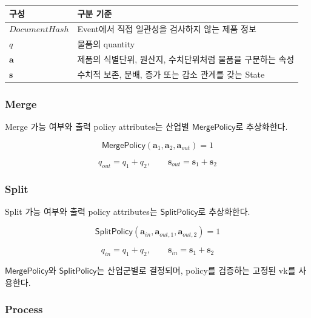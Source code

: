 \documentclass[11pt,a4paper]{extarticle}
\begin{document}
\begin{center}
  \renewcommand{\arraystretch}{1.35}
  \setlength{\tabcolsep}{8pt}
  \begin{tabularx}{\textwidth}{
      @{}
      >{\raggedright\arraybackslash}p{28mm}
      >{\raggedright\arraybackslash}X
      @{}
    }
    \toprule
    \textbf{구성} & \textbf{구분 기준}                    \\
    \midrule
    \(\mathit{DocumentHash}\)
                & Event에서 직접 일관성을 검사하지 않는 제품 정보     \\
    \(q\)
                & 물품의 quantity                      \\
    \(\mathbf{a}\)
                & 제품의 식별단위, 원산지, 수치단위처럼 물품을 구분하는 속성 \\
    \(\mathbf{s}\)
                & 수치적 보존, 분배, 증가 또는 감소 관계를 갖는 State \\
    \bottomrule
  \end{tabularx}
\end{center}

\subsubsection*{Merge}

Merge 가능 여부와 출력 policy attributes는 산업별
\(\mathsf{MergePolicy}\)로 추상화한다.

\[
  \mathsf{MergePolicy}
  (\mathbf{a}_1,\mathbf{a}_2,\mathbf{a}_{out})
  =1
\]

\[
  q_{out}=q_1+q_2,
  \qquad
  \mathbf{s}_{out}=\mathbf{s}_1+\mathbf{s}_2
\]

\subsubsection*{Split}

Split 가능 여부와 출력 policy attributes는
\(\mathsf{SplitPolicy}\)로 추상화한다.

\[
  \mathsf{SplitPolicy}
  (\mathbf{a}_{in},\mathbf{a}_{out,1},\mathbf{a}_{out,2})
  =1
\]

\[
  q_{in}=q_1+q_2,
  \qquad
  \mathbf{s}_{in}=\mathbf{s}_1+\mathbf{s}_2
\]

\(\mathsf{MergePolicy}\)와 \(\mathsf{SplitPolicy}\)는 산업군별로 결정되며,
policy를 검증하는 고정된 vk를 사용한다.

\subsubsection*{Process}
\end{document}
